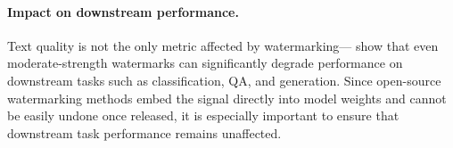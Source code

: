 \paragraph{Impact on downstream performance.}
Text quality is not the only metric affected by watermarking—\citet{ajith-etal-2024-downstream} show that even moderate-strength watermarks can significantly degrade performance on downstream tasks such as classification, QA, and generation. Since open-source watermarking methods embed the signal directly into model weights and cannot be easily undone once released, it is especially important to ensure that downstream task performance remains unaffected.